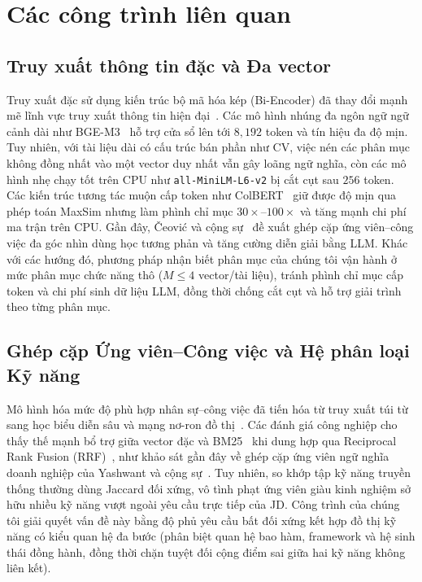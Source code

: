\section{Các công trình liên quan}

\subsection{Truy xuất thông tin đặc và Đa vector}
Truy xuất đặc sử dụng kiến trúc bộ mã hóa kép (Bi-Encoder) đã thay đổi mạnh mẽ lĩnh vực truy xuất thông tin hiện đại~\cite{reimers2019sentencebert,karpukhin2020dense}. Các mô hình nhúng đa ngôn ngữ ngữ cảnh dài như BGE-M3~\cite{chen2024bge} hỗ trợ cửa sổ lên tới $8{,}192$ token và tín hiệu đa độ mịn. Tuy nhiên, với tài liệu dài có cấu trúc bán phần như CV, việc nén các phân mục không đồng nhất vào một vector duy nhất vẫn gây loãng ngữ nghĩa, còn các mô hình nhẹ chạy tốt trên CPU như \texttt{all-MiniLM-L6-v2} bị cắt cụt sau $256$ token. Các kiến trúc tương tác muộn cấp token như ColBERT~\cite{khattab2020colbert} giữ được độ mịn qua phép toán MaxSim nhưng làm phình chỉ mục $30\times$--$100\times$ và tăng mạnh chi phí ma trận trên CPU. Gần đây, \v{C}eovi\'{c} và cộng sự~\cite{ceovic2026multiview} đề xuất ghép cặp ứng viên--công việc đa góc nhìn dùng học tương phản và tăng cường diễn giải bằng LLM. Khác với các hướng đó, phương pháp nhận biết phân mục của chúng tôi vận hành ở mức phân mục chức năng thô ($M \le 4$ vector/tài liệu), tránh phình chỉ mục cấp token và chi phí sinh dữ liệu LLM, đồng thời chống cắt cụt và hỗ trợ giải trình theo từng phân mục.

\subsection{Ghép cặp Ứng viên--Công việc và Hệ phân loại Kỹ năng}
Mô hình hóa mức độ phù hợp nhân sự--công việc đã tiến hóa từ truy xuất túi từ sang học biểu diễn sâu và mạng nơ-ron đồ thị~\cite{zhu2018person,bian2020learning,zhang2021personalized}. Các đánh giá công nghiệp cho thấy thế mạnh bổ trợ giữa vector đặc và BM25~\cite{robertson2009probabilistic} khi dung hợp qua Reciprocal Rank Fusion (RRF)~\cite{cormack2009reciprocal}, như khảo sát gần đây về ghép cặp ứng viên ngữ nghĩa doanh nghiệp của Yashwant và cộng sự~\cite{yashwant2026semantic}. Tuy nhiên, so khớp tập kỹ năng truyền thống thường dùng Jaccard đối xứng, vô tình phạt ứng viên giàu kinh nghiệm sở hữu nhiều kỹ năng vượt ngoài yêu cầu trực tiếp của JD. Công trình của chúng tôi giải quyết vấn đề này bằng độ phủ yêu cầu bất đối xứng kết hợp đồ thị kỹ năng có kiểu quan hệ đa bước (phân biệt quan hệ bao hàm, framework và hệ sinh thái đồng hành, đồng thời chặn tuyệt đối cộng điểm sai giữa hai kỹ năng không liên kết).

